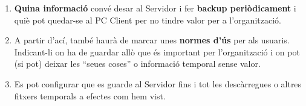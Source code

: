 \documentclass[
  a4paper,
]{article}
\providecommand{\tightlist}{%
  \setlength{\itemsep}{0pt}\setlength{\parskip}{0pt}}
\begin{document}
\begin{enumerate}
\def\labelenumi{\arabic{enumi}.}
\tightlist
\item
  \textbf{Quina informació} convé desar al Servidor i fer \textbf{backup
  periòdicament} i quiè pot quedar-se al PC Client per no tindre valor
  per a l'organització.
\item
  A partir d'ací, també haurà de marcar unes \textbf{normes d'ús} per
  als usuaris. Indicant-li on ha de guardar allò que és important per
  l'organització i on pot (si pot) deixar les ``seues coses'' o
  informació temporal sense valor.
\item
  Es pot configurar que es guarde al Servidor fins i tot les
  descàrregues o altres fitxers temporals a efectes com hem vist.
\end{enumerate}
\end{document}
